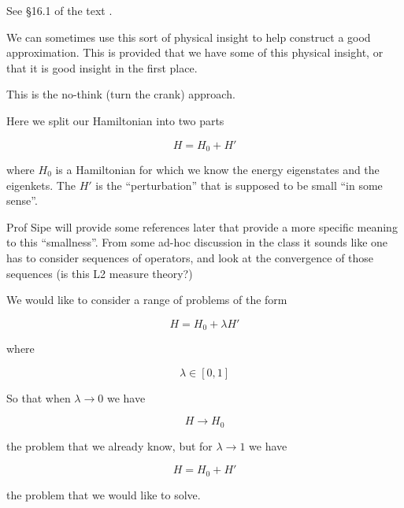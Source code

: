 See \S 16.1 of the text \citep{desai2009quantum}.

We can sometimes use this sort of physical insight to help construct a good approximation.  This is provided that we have some of this physical insight, or that it is good insight in the first place.

This is the no-think (turn the crank) approach.

Here we split our Hamiltonian into two parts

\begin{equation}\label{eqn:qmTwoL3:310}
H = H_0 + H'
\end{equation}

where $H_0$ is a Hamiltonian for which we know the energy eigenstates and the eigenkets.  The $H'$ is the ``perturbation'' that is supposed to be small ``in some sense''.

Prof Sipe will provide some references later that provide a more specific meaning to this ``smallness''.  From some ad-hoc discussion in the class it sounds like one has to consider sequences of operators, and look at the convergence of those sequences (is this L2 measure theory?)


We would like to consider a range of problems of the form

\begin{equation}\label{eqn:qmTwoL3:330}
H = H_0 + \lambda H'
\end{equation}

where

\begin{equation}\label{eqn:qmTwoL3:350}
\lambda \in [0,1]
\end{equation}

So that when $\lambda \rightarrow 0$ we have

\begin{equation}\label{eqn:qmTwoL3:370}
H \rightarrow H_0
\end{equation}

the problem that we already know, but for $\lambda \rightarrow 1$ we have

\begin{equation}\label{eqn:qmTwoL3:390}
H = H_0 + H'
\end{equation}

the problem that we would like to solve.

